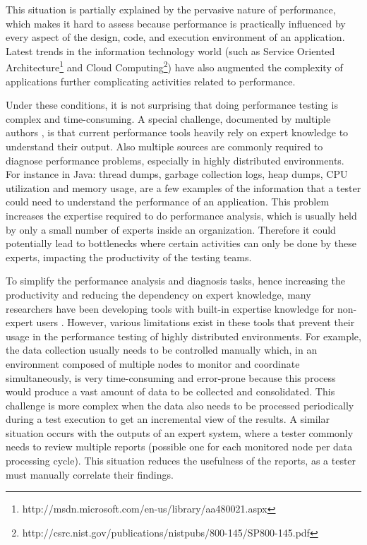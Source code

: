 \documentclass[runningheads,a4paper]{llncs}
\begin{document}
This situation is partially explained by the pervasive nature of
performance, which makes it hard to assess because performance is practically
influenced by every aspect of the design, code, and execution environment
of an application. Latest trends in the information technology world (such as
Service Oriented
Architecture\footnote{http://msdn.microsoft.com/en-us/library/aa480021.aspx} and 
Cloud Computing\footnote{http://csrc.nist.gov/publications/nistpubs/800-145/SP800-145.pdf}) 
have also augmented the complexity of applications further complicating activities related to
performance. 

Under these conditions, it is not surprising that doing performance
testing is complex and time-consuming. A special challenge, documented by
multiple authors \cite{Woodside2007,trevor1,Angelopoulos2012}, is that current
performance tools heavily rely on expert knowledge to understand their output.
Also multiple sources are commonly required to diagnose performance problems,
especially in highly distributed environments. For instance in Java: thread dumps, 
garbage collection logs, heap dumps, CPU utilization and memory usage, are a few
examples of the information that a tester could need to understand the performance 
of an application. This problem increases the expertise required to do
performance analysis, which is usually held by only a small number of experts 
inside an organization\cite{Spear2009}. Therefore it could potentially lead to
bottlenecks where certain activities can only be done by these experts,
impacting the productivity of the testing teams\cite{Angelopoulos2012}.

To simplify the performance analysis and diagnosis tasks, hence increasing the
productivity and reducing the dependency on expert knowledge, many researchers
have been developing tools with built-in expertise knowledge for non-expert
users \cite{Altman2010,pat7,Angelopoulos2012}. However, various limitations
exist in these tools that prevent their usage in the performance testing of
highly distributed environments. For example, the data collection usually needs
to be controlled manually which, in an environment composed of multiple nodes to
monitor and coordinate simultaneously, is very time-consuming and error-prone
because this process would produce a vast amount of data to be collected and
consolidated. This challenge is more complex when the data also needs to be
processed periodically during a test execution to get an incremental view of the 
results. A similar situation occurs with the outputs of an expert system, where
a tester commonly needs to review multiple reports (possible one for each monitored 
node per data processing cycle). This situation reduces the usefulness of the
reports, as a tester must manually correlate their findings.
\end{document}
